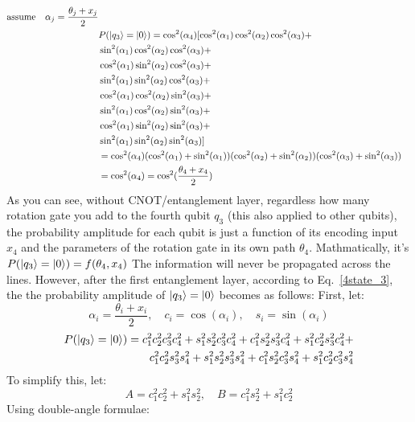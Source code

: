 \documentclass[12pt]{article}
\numberwithin{equation}{section}  %
\theoremstyle{definition}
\theoremstyle{plain}
\theoremstyle{remark}
\begin{document}
\begin{equation*}
\begin{aligned}
    \text{assume}\quad\alpha_{j}=\frac{\theta_j+x_j}{2}\\
    &P(\ket{q_3}=\ket{0})=\cos^2(\alpha_4)[\cos^2(\alpha_1)\cos^2(\alpha_2)\cos^2(\alpha_3)+\\
    &\sin^2(\alpha_1)\cos^2(\alpha_2)\cos^2(\alpha_3)+\\
    &\cos^2(\alpha_1)\sin^2(\alpha_2)\cos^2(\alpha_3)+\\
    &\sin^2(\alpha_1)\sin^2(\alpha_2)\cos^2(\alpha_3)+\\
    &\cos^2(\alpha_1)\cos^2(\alpha_2)\sin^2(\alpha_3)+\\
    &\sin^2(\alpha_1)\cos^2(\alpha_2)\sin^2(\alpha_3)+\\
    &\cos^2(\alpha_1)\sin^2(\alpha_2)\sin^2(\alpha_3)+\\
    &\sin^2(\alpha_1)\sin^2(\alpha_2)\sin^2(\alpha_3)]\\
    &=\cos^2(\alpha_4)(\cos^2(\alpha_1)+\sin^2(\alpha_1))(\cos^2(\alpha_2)+\sin^2(\alpha_2))(\cos^2(\alpha_3)+\sin^2(\alpha_3))\\
    &=\cos^2(\alpha_4)=\cos^2(\frac{\theta_4+x_4}{2})
\end{aligned}
\end{equation*}
As you can see, without CNOT/entanglement layer, regardless how many rotation gate you add to the fourth qubit $q_3$ (this also applied to other qubits), the probability amplitude for each qubit is just a function of its encoding input $x_4$ and the parameters of the rotation gate in its own path $\theta_4$. Mathmatically, it's $P(\ket{q_3}=\ket{0})=f(\theta_4,x_4)$ The information will never be propagated across the lines. However, after the first entanglement layer, according to Eq.~\ref{4state_3}, the the probability amplitude of $\ket{q_3}=\ket{0}$ becomes as follows:
First, let:
\[\alpha_i=\frac{\theta_i+x_i}{2},\quad c_i=\cos(\alpha_i),\quad s_i=\sin(\alpha_i)\]
\begin{equation*}
\begin{aligned}
P(\ket{q_3}=\ket{0})=c^2_1c^2_2c^2_3c^2_4+
s^2_1s^2_2c^2_3c^2_4+
c^2_1s^2_2s^2_3c^2_4+
s^2_1c^2_2s^2_3c^2_4+\\
c^2_1c^2_2s^2_3s^2_4+
s^2_1s^2_2s^2_3s^2_4+
c^2_1s^2_2c^2_3s^2_4+
s^2_1c^2_2c^2_3s^2_4
\end{aligned}
\end{equation*}
To simplify this, let: 
\[A=c_1^2c_2^2+s_1^2s_2^2,\quad B=c_1^2s_2^2+s_1^2c_2^2\]
Using double-angle formulae:
\end{document}
